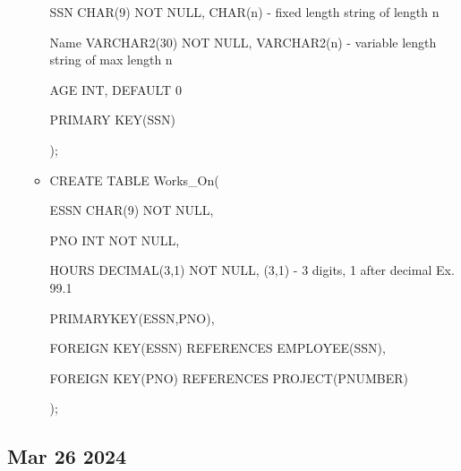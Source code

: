 \documentclass[12pt]{article}
\begin{document}
\begin{itemize}
\begin{itemize}
						SSN CHAR(9) NOT NULL,				CHAR(n) - fixed length string of length n

						Name VARCHAR2(30) NOT NULL, 		VARCHAR2(n) - variable length string of max length n

						AGE INT, DEFAULT 0

						PRIMARY KEY(SSN)

						);
			  \item CREATE TABLE Works\_On(

						ESSN CHAR(9) NOT NULL,

						PNO INT NOT NULL,

						HOURS DECIMAL(3,1) NOT NULL,      (3,1) - 3 digits, 1 after decimal Ex. 99.1

						PRIMARYKEY(ESSN,PNO),

						FOREIGN KEY(ESSN) REFERENCES EMPLOYEE(SSN),
						
						FOREIGN KEY(PNO) REFERENCES PROJECT(PNUMBER)

						);			
			\end{itemize}
\end{itemize}

\subsection*{Mar 26 2024}
\end{document}
